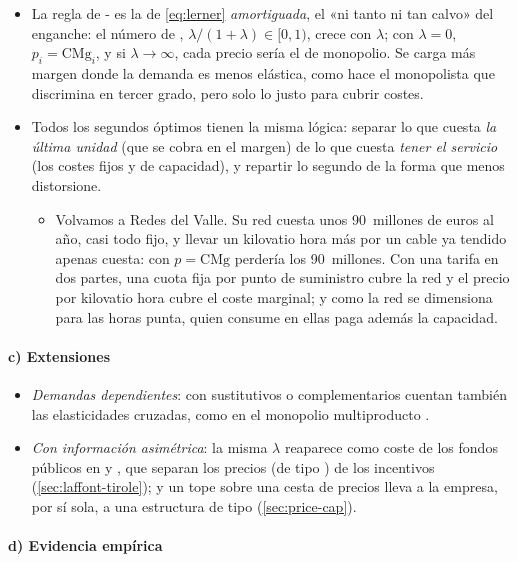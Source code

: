 \documentclass[11pt]{article}
\begin{document}
\begin{itemize}
\item La regla de - es la de  \eqref{eq:lerner} \emph{amortiguada}, el «ni tanto ni tan calvo» del enganche: el número de , $\lambda/(1+\lambda)\in[0,1)$, crece con $\lambda$; con $\lambda=0$, $p_i=\mathrm{CMg}_i$, y si $\lambda\to\infty$, cada precio sería el de monopolio. Se carga más margen donde la demanda es menos elástica, como hace el monopolista que discrimina en tercer grado, pero solo lo justo para cubrir costes.
\item Todos los segundos óptimos tienen la misma lógica: separar lo que cuesta \emph{la última unidad} (que se cobra en el margen) de lo que cuesta \emph{tener el servicio} (los costes fijos y de capacidad), y repartir lo segundo de la forma que menos distorsione.
  \begin{itemize}
  \item Volvamos a Redes del Valle. Su red cuesta unos 90~millones de euros al año, casi todo fijo, y llevar un kilovatio hora más por un cable ya tendido apenas cuesta: con $p=\mathrm{CMg}$ perdería los 90~millones. Con una tarifa en dos partes, una cuota fija por punto de suministro cubre la red y el precio por kilovatio hora cubre el coste marginal; y como la red se dimensiona para las horas punta, quien consume en ellas paga además la capacidad.
  \end{itemize}
\end{itemize}

\paragraph{c) Extensiones}

\begin{itemize}
\item \emph{Demandas dependientes}: con sustitutivos o complementarios cuentan también las elasticidades cruzadas, como en el monopolio multiproducto .
\item \emph{Con información asimétrica}: la misma $\lambda$ reaparece como coste de los fondos públicos en  y , que separan los precios (de tipo ) de los incentivos (\ref{sec:laffont-tirole}); y un tope sobre una cesta de precios lleva a la empresa, por sí sola, a una estructura de tipo  (\ref{sec:price-cap}).
\end{itemize}

\paragraph{d) Evidencia empírica}
\end{document}
